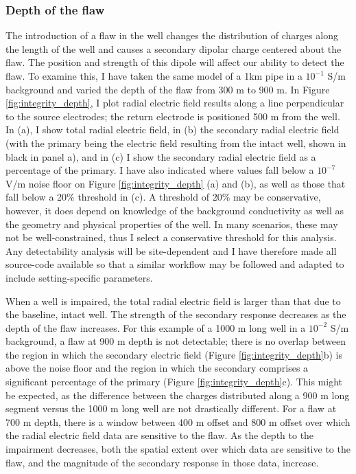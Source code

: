 \subsubsection{Depth of the flaw}
The introduction of a flaw in the well changes the distribution of charges along the length of the well and causes a secondary dipolar charge centered about the flaw. The position and strength of this dipole will affect our ability to detect the flaw. To examine this, I have taken the same model of a 1km pipe in a $10^{-1}$ S/m background and varied the depth of the flaw from 300 m to 900 m. In Figure \ref{fig:integrity_depth}, I plot radial electric field results along a line perpendicular to the source electrodes; the return electrode is positioned 500 m from the well. In (a), I show total radial electric field, in (b) the secondary radial electric field (with the primary being the electric field resulting from the intact well, shown in black in panel a), and in (c) I show the secondary radial electric field as a percentage of the primary. I have also indicated where values fall below a $10^{-7}$ V/m noise floor on Figure \ref{fig:integrity_depth} (a) and (b), as well as those that fall below a 20\% threshold in (c). A threshold of 20\% may be conservative, however, it does depend on knowledge of the background conductivity as well as the geometry and physical properties of the well. In many scenarios, these may not be well-constrained, thus I select a conservative threshold for this analysis. Any detectability analysis will be site-dependent and I have therefore made all source-code available so that a similar workflow may be followed and adapted to include setting-specific parameters.

When a well is impaired, the total radial electric field is larger than that due to the baseline, intact well. The strength of the secondary response decreases as the depth of the flaw increases. For this example of a 1000 m long well in a $10^{-2}$ S/m background, a flaw at 900 m depth is not detectable; there is no overlap between the region in which the secondary electric field (Figure \ref{fig:integrity_depth}b) is above the noise floor and the region in which the secondary comprises a significant percentage of the primary (Figure \ref{fig:integrity_depth}c). This might be expected, as the difference between the charges distributed along a 900 m long segment versus the 1000 m long well are not drastically different. For a flaw at 700 m depth, there is a window between 400 m offset and 800 m offset over which the radial electric field data are sensitive to the flaw. As the depth to the impairment decreases, both the spatial extent over which data are sensitive to the flaw, and the magnitude of the secondary response in those data, increase.



